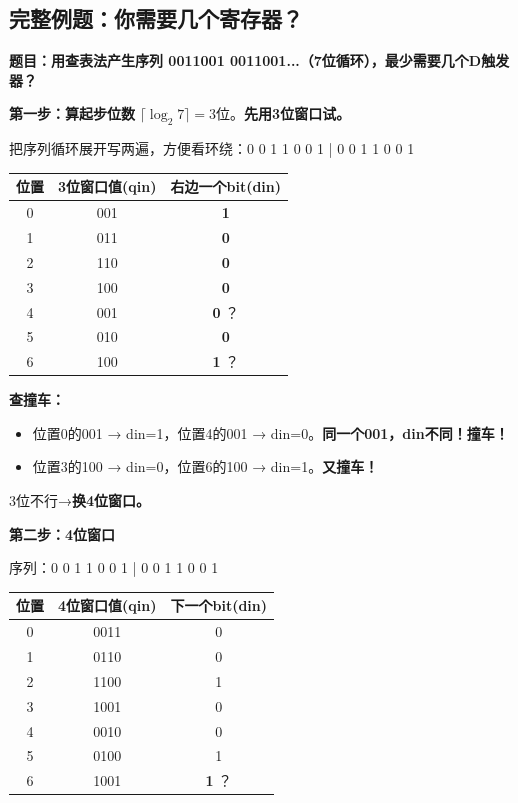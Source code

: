 \subsection{完整例题：你需要几个寄存器？}

\textbf{题目：用查表法产生序列 0011001 0011001...（7位循环），最少需要几个D触发器？}

\textbf{第一步：算起步位数} $\lceil\log_2 7\rceil = 3$位。\textbf{先用3位窗口试。}

把序列循环展开写两遍，方便看环绕：0 0 1 1 0 0 1 | 0 0 1 1 0 0 1

\begin{center}
\begin{tabular}{c|c|c}
位置 & 3位窗口值(qin) & 右边一个bit(din) \\
\hline
0 & 001 & \textbf{1} \\
1 & 011 & \textbf{0} \\
2 & 110 & \textbf{0} \\
3 & 100 & \textbf{0} \\
4 & 001 & \textbf{0} ？\\
5 & 010 & \textbf{0} \\
6 & 100 & \textbf{1} ？\\
\hline
\end{tabular}
\end{center}

\textbf{查撞车：}
\begin{itemize}
  \item 位置0的001 → din=1，位置4的001 → din=0。\textbf{同一个001，din不同！撞车！}
  \item 位置3的100 → din=0，位置6的100 → din=1。\textbf{又撞车！}
\end{itemize}

3位不行→\textbf{换4位窗口。}

\textbf{第二步：4位窗口}

序列：0 0 1 1 0 0 1 | 0 0 1 1 0 0 1

\begin{center}
\begin{tabular}{c|c|c}
位置 & 4位窗口值(qin) & 下一个bit(din) \\
\hline
0 & 0011 & 0 \\
1 & 0110 & 0 \\
2 & 1100 & 1 \\
3 & 1001 & 0 \\
4 & 0010 & 0 \\
5 & 0100 & 1 \\
6 & 1001 & \textbf{1} ？\\
\hline
\end{tabular}
\end{center}


